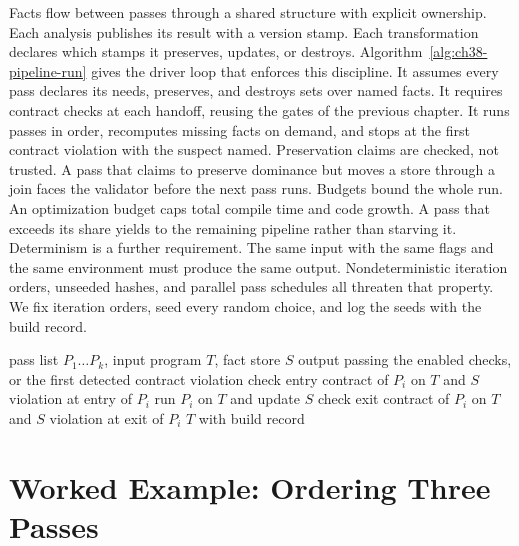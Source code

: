 Facts flow between passes through a shared structure with explicit ownership.
Each analysis publishes its result with a version stamp.
Each transformation declares which stamps it preserves, updates, or destroys.
Algorithm~\ref{alg:ch38-pipeline-run} gives the driver loop that enforces this discipline.
It assumes every pass declares its needs, preserves, and destroys sets over named facts.
It requires contract checks at each handoff, reusing the gates of the previous chapter.
It runs passes in order, recomputes missing facts on demand, and stops at the first contract violation with the suspect named.
Preservation claims are checked, not trusted.
A pass that claims to preserve dominance but moves a store through a join faces the validator before the next pass runs.
Budgets bound the whole run.
An optimization budget caps total compile time and code growth.
A pass that exceeds its share yields to the remaining pipeline rather than starving it.
Determinism is a further requirement.
The same input with the same flags and the same environment must produce the same output.
Nondeterministic iteration orders, unseeded hashes, and parallel pass schedules all threaten that property.
We fix iteration orders, seed every random choice, and log the seeds with the build record.

\begin{algorithm}[htbp]
\caption{Contract-checked pipeline driver with fact versions}\label{alg:ch38-pipeline-run}
\begin{pseudocode}
\Require pass list $P_1 \dots P_k$, input program $T$, fact store $S$
\Ensure output passing the enabled checks, or the first detected contract violation
\State check entry contract of $P_i$ on $T$ and $S$
\State \Return violation at entry of $P_i$
\EndIf
\State run $P_i$ on $T$ and update $S$ 
\State check exit contract of $P_i$ on $T$ and $S$
\State \Return violation at exit of $P_i$
\EndIf
\EndFor
\State \Return $T$ with build record
\end{pseudocode}
\end{algorithm}

\section{Worked Example: Ordering Three Passes}\label{sec:ch38-worked}


